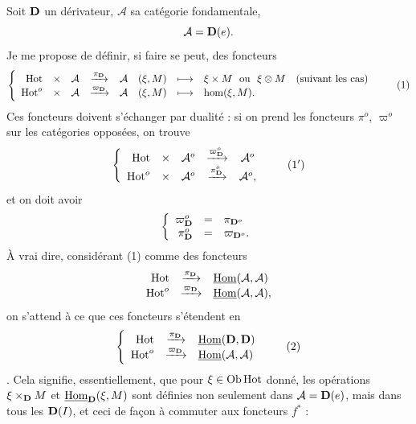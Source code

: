 Soit $\mathbf{D}$ un dérivateur, $\mathcal{A}$ sa catégorie fondamentale,
\[
\mathcal{A} = \mathbf{D}(e).
\]
Je me propose de définir, si faire se peut, des foncteurs
\[
\left\{
\begin{array}{rccccccl}
\Hot & \times & \mathcal{A} & \xrightarrow{\pi_{\D}} & \mathcal{A} & (\xi, M) & \longmapsto & \xi \times M \ \text{ ou } \ \xi \otimes M \quad \text{(suivant les cas)}\\
\Hot^o & \times & \mathcal{A} & \xrightarrow{\varpi_{\D}} & \mathcal{A} & (\xi, M) & \longmapsto & \hm(\xi, M).
\end{array}
\right.
\tag*{(1)}
\]
Ces foncteurs doivent s'échanger par dualité : si on prend les foncteurs $\pi^o$, $\varpi^o$ sur les catégories opposées, on trouve
\[
\left\{
\begin{array}{rcccc}
\Hot & \times & \mathcal{A}^o & \xrightarrow{\varpi^o_{\D}} & \mathcal{A}^o\\
\Hot^o & \times & \mathcal{A}^o & \xrightarrow{\pi^o_{\D}} & \mathcal{A}^o,
\end{array}
\right.
\tag*{(1$'$)}
\]
et on doit avoir
\[
\left\{
\begin{array}{rcl}
\varpi^o_{\mathbf{D}} & = & \pi_{\mathbf{D}^o}\\
\pi^o_{\mathbf{D}} & = & \varpi_{\mathbf{D}^o}.
\end{array}
\right.
\]
À vrai dire, considérant (1) comme des foncteurs
\[
\begin{array}{rcl}
\mathrm{Hot} & \xrightarrow{\pi_{\mathbf{D}}} & \underline{\mathrm{Hom}}(\mathcal{A}, \mathcal{A})\\
\mathrm{Hot}^o & \xrightarrow{\varpi_{\mathbf{D}}} & \underline{\mathrm{Hom}}(\mathcal{A}, \mathcal{A}),
\end{array}
\]
on s'attend à ce que ces foncteurs s'étendent en
\[
\left\{
\begin{array}{rcl}
\Hot & \xrightarrow{\pi_{\D}} & \uHom(\D, \D)\\
\Hot^o & \xrightarrow{\varpi_{\D}} & \uHom(\mathcal{A}, \mathcal{A})
\end{array}
\right.
\tag*{(2)}
\]
. Cela signifie, essentiellement, que pour $\xi \in \mathrm{Ob}\,\mathrm{Hot}$ donné, les opérations $\xi \times_{\mathbf{D}} M$ et $\underline{\mathrm{Hom}}_{\mathbf{D}}(\xi, M)$ sont définies non seulement dans $\mathcal{A} = \mathbf{D}(e)$, mais dans tous les $\mathbf{D}(I)$, et ceci de façon à commuter aux foncteurs $f^*$ :

